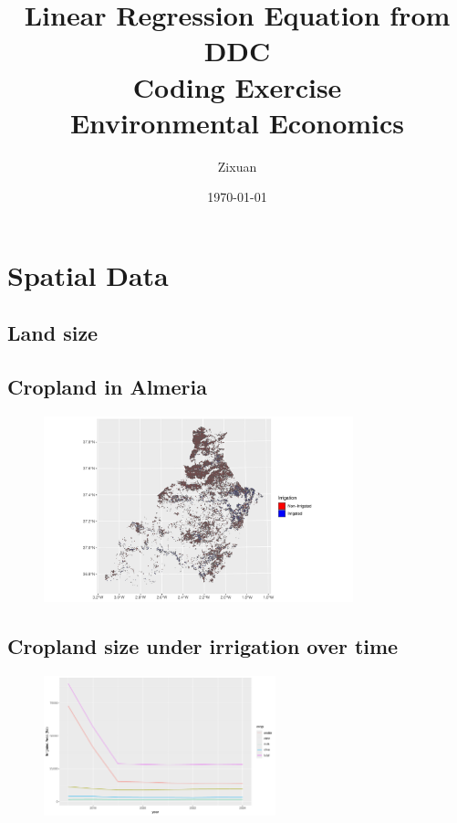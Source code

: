 \documentclass[12pt]{article}[margin=1in]
\title{\textbf{Linear Regression Equation from DDC} \\
\vspace{.3cm}
\large Coding Exercise \\
Environmental Economics}
\author{Zixuan}
\date{\today}
\begin{document}
\maketitle

\section{Spatial Data}
\subsection{Land size}


\subsection{Cropland in Almeria}
\begin{figure}[!htbp]
    \centering
    \includegraphics[width=0.8\textwidth]{../Figures/land_use_distribution_almeria_2021.pdf}
\end{figure}

\subsection{Cropland size under irrigation over time}
\begin{figure}[!htbp]
    \centering
    \includegraphics[width=0.6\textwidth]{../Figures/irrigated_area_by_crop_over_time.pdf}
\end{figure}
\end{document}
